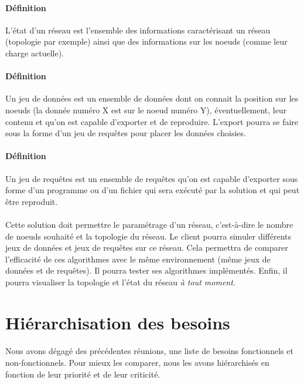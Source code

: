 \documentclass[12pt]{article}
\begin{document}
\paragraph{Définition} L'état d'un réseau est l'ensemble des informations caractérisant un réseau (topologie par exemple) ainsi que des informations sur les noeuds (comme leur charge actuelle).

\paragraph{Définition} Un jeu de données est un ensemble de données dont on connait la position sur les noeuds (la donnée numéro X est sur le noeud numéro Y), éventuellement, leur contenu et qu'on est capable d'exporter et de reproduire. L'export pourra se faire sous la forme d'un jeu de requêtes pour placer les données choisies.

\paragraph{Définition} Un jeu de requêtes est un ensemble de requêtes qu'on est capable d'exporter sous forme d'un programme ou d'un fichier qui sera exécuté par la solution et qui peut être reproduit.

\paragraph{}Cette solution doit permettre le paramétrage d'un réseau, c'est-à-dire le nombre de noeuds souhaité et la topologie du réseau.
Le client pourra simuler différents jeux de données et jeux de requêtes sur ce réseau. Cela permettra de comparer l'efficacité de ces algorithmes avec le même environnement (même jeux de données et de requêtes).
Il pourra tester ses algorithmes implémentés.
Enfin, il pourra visualiser la topologie et l'état du réseau \textit{à tout moment}.

\newpage
\section{Hiérarchisation des besoins}

\paragraph{} Nous avons dégagé des précédentes réunions, une liste de besoins fonctionnels et non-fonctionnels. 
Pour mieux les comparer, nous les avons hiérarchisés en fonction de leur priorité et de leur criticité.
\end{document}

